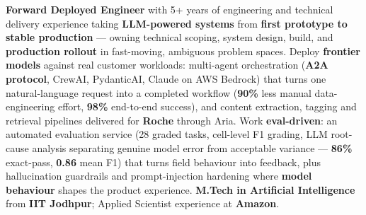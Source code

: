 \documentclass[letter,10pt]{article}
\begin{document}

\textbf{Forward Deployed Engineer} with 5+ years of engineering and technical delivery experience taking \textbf{LLM-powered systems} from \textbf{first prototype to stable production} --- owning technical scoping, system design, build, and \textbf{production rollout} in fast-moving, ambiguous problem spaces.
Deploy \textbf{frontier models} against real customer workloads: multi-agent orchestration (\textbf{A2A protocol}, CrewAI, PydanticAI, Claude on AWS Bedrock) that turns one natural-language request into a completed workflow (\textbf{90\%} less manual data-engineering effort, \textbf{98\%} end-to-end success), and content extraction, tagging and retrieval pipelines delivered for \textbf{Roche} through Aria.
Work \textbf{eval-driven}: an automated evaluation service (28 graded tasks, cell-level F1 grading, LLM root-cause analysis separating genuine model error from acceptable variance --- \textbf{86\%} exact-pass, \textbf{0.86} mean F1) that turns field behaviour into feedback, plus hallucination guardrails and prompt-injection hardening where \textbf{model behaviour} shapes the product experience.
\textbf{M.Tech in Artificial Intelligence} from \textbf{IIT Jodhpur}; Applied Scientist experience at \textbf{Amazon}.
\end{document}

